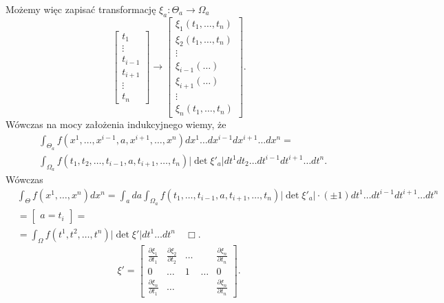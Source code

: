 \documentclass[../main.tex]{subfiles}
\begin{document}
Możemy więc zapisać transformację $\xi_a: \Theta_a\to\Omega_a$
 \[
     \begin{bmatrix} t_1\\ \vdots\\ t_{i-1}\\ t_{i+1} \\ \vdots \\ t_n \end{bmatrix} \to \begin{bmatrix} \xi_1(t_1,\ldots,t_n) \\ \xi_2(t_1,\ldots,t_n) \\ \vdots \\ \xi_{i-1}(\ldots) \\ \xi_{i+1}(\ldots) \\ \vdots \\ \xi_n(t_1,\ldots,t_n)\end{bmatrix}
.\]
Wówczas na mocy założenia indukcyjnego wiemy, że
\begin{align*}
    &\int_{\Theta_a}f(x^1,\ldots,x^{i-1},a,x^{i+1},\ldots,x^n) dx^1 \ldots dx^{i-1} dx^{i+1} \ldots dx^n = \\
    &\int_{\Omega_a} f(t_1,t_2,\ldots,t_{i-1},a,t_{i+1},\ldots,t_n) |\det \xi'_a | dt^1 dt_2 \ldots dt^{i-1} dt^{i+1} \ldots dt^n
.\end{align*}
Wówczas
\begin{align*}
    &\int_{\Theta}f(x^1,\ldots,x^n)dx^n = \int_a da \int_{\Omega_a}f(t_1,\ldots,t_{i-1},a,t_{i+1},\ldots,t_n) |\det \xi'_a| \cdot (\pm 1) dt^1 \ldots dt^{i-1} dt^{i+1} \ldots dt^n\\
    &= \begin{bmatrix} a=t_i \end{bmatrix} =\\
    &= \int_{\Omega} f(t^1,t^2,\ldots,t^n)|\det \xi' | dt^1 \ldots dt^n\quad\Box
.\end{align*}
\[
    \xi' = \begin{bmatrix} \frac{\partial \xi_1}{\partial t_1} & \frac{\partial \xi_2}{\partial t_2} & \ldots && \frac{\partial \xi_n}{\partial t_n}\\ 0 & \ldots & 1 & \ldots & 0 \\ \frac{\partial \xi_n}{\partial t_1} & \ldots &&& \frac{\partial \xi_n}{\partial t_n}  \end{bmatrix}
.\]
\end{document}
